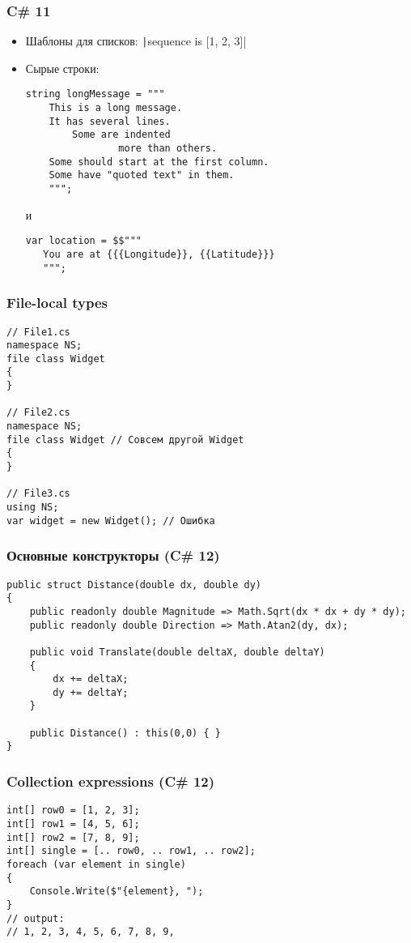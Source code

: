 \documentclass{../../slides-style}
\begin{document}
    \begin{frame}[fragile]
        \frametitle{C\# 11}
        \begin{itemize}
            \item Шаблоны для списков: \texttt|sequence is [1, 2, 3]|
            \item Сырые строки:
                \begin{verbatim}
string longMessage = """
    This is a long message.
    It has several lines.
        Some are indented
                more than others.
    Some should start at the first column.
    Some have "quoted text" in them.
    """;
                \end{verbatim}
                и
                \begin{verbatim}
var location = $$"""
   You are at {{{Longitude}}, {{Latitude}}}
   """;
                \end{verbatim}
        \end{itemize}
    \end{frame}

    \begin{frame}[fragile]
        \frametitle{File-local types}
        \begin{verbatim}
// File1.cs
namespace NS;
file class Widget
{
}

// File2.cs
namespace NS;
file class Widget // Совсем другой Widget
{
}

// File3.cs
using NS;
var widget = new Widget(); // Ошибка
        \end{verbatim}
    \end{frame}

    \begin{frame}[fragile]
        \frametitle{Основные конструкторы (C\# 12)}
        \begin{verbatim}
public struct Distance(double dx, double dy)
{
    public readonly double Magnitude => Math.Sqrt(dx * dx + dy * dy);
    public readonly double Direction => Math.Atan2(dy, dx);

    public void Translate(double deltaX, double deltaY)
    {
        dx += deltaX;
        dy += deltaY;
    }

    public Distance() : this(0,0) { }
}
        \end{verbatim}
    \end{frame}

    \begin{frame}[fragile]
        \frametitle{Collection expressions (C\# 12)}
        \begin{verbatim}
int[] row0 = [1, 2, 3];
int[] row1 = [4, 5, 6];
int[] row2 = [7, 8, 9];
int[] single = [.. row0, .. row1, .. row2];
foreach (var element in single)
{
    Console.Write($"{element}, ");
}
// output:
// 1, 2, 3, 4, 5, 6, 7, 8, 9,
        \end{verbatim}
    \end{frame}
\end{document}
